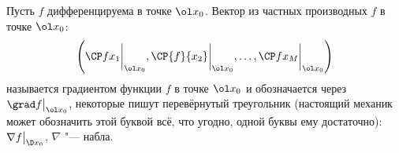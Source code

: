  Пусть $f$ дифференцируема в точке $\ol x_0$. Вектор из частных производных $f$ в точке $\ol x_0$:
	 \[\left(\CP f{x_1}\bigg|_{\ol x_0},\CP{f}{x_2}\bigg|_{\ol x_0},\ldots,\CP f{x_M}\bigg|_{\ol x_0}\right)\]
	 называется градиентом функции $f$ в точке $\ol x_0$ и  обозначается через $\grad f\big|_{\ol x_0}$,
	 некоторые пишут перевёрнутый треугольник (настоящий механик может обозначить этой буквой всё, что угодно, одной буквы ему достаточно):
	 $\nabla f\big|_{\D x_0}$, $\nabla$ "--- набла.
	 